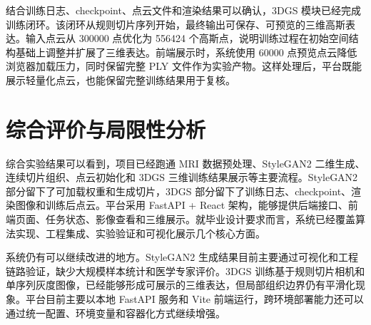 结合训练日志、checkpoint、点云文件和渲染结果可以确认，3DGS 模块已经完成训练闭环。该闭环从规则切片序列开始，最终输出可保存、可预览的三维高斯表达。输入点云从 300000 点优化为 556424 个高斯点，说明训练过程在初始空间结构基础上调整并扩展了三维表达。前端展示时，系统使用 60000 点预览点云降低浏览器加载压力，同时保留完整 PLY 文件作为实验产物。这样处理后，平台既能展示轻量化点云，也能保留完整训练结果用于复核。

\section{综合评价与局限性分析}
综合实验结果可以看到，项目已经跑通 MRI 数据预处理、StyleGAN2 二维生成、连续切片组织、点云初始化和 3DGS 三维训练结果展示等主要流程。StyleGAN2 部分留下了可加载权重和生成切片，3DGS 部分留下了训练日志、checkpoint、渲染图像和训练后点云。平台采用 FastAPI + React 架构，能够提供后端接口、前端页面、任务状态、影像查看和三维展示。就毕业设计要求而言，系统已经覆盖算法实现、工程集成、实验验证和可视化展示几个核心方面。

系统仍有可以继续改进的地方。StyleGAN2 生成结果目前主要通过可视化和工程链路验证，缺少大规模样本统计和医学专家评价。3DGS 训练基于规则切片相机和单序列灰度图像，已经能够形成可展示的三维表达，但局部组织边界仍有平滑化现象。平台目前主要以本地 FastAPI 服务和 Vite 前端运行，跨环境部署能力还可以通过统一配置、环境变量和容器化方式继续增强。
